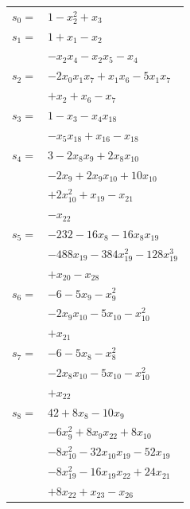 \begingroup
\small
\setlength{\tabcolsep}{2pt}
\setlength{\LTleft}{0pt}
\begin{longtable}{@{}r@{\;}l@{}}
\(s_{0}=\) & \(\displaystyle 1 -x_{2}^{2} +x_{3}\) \\[3pt]
\(s_{1}=\) & \(\displaystyle 1 +x_{1} -x_{2}\) \\
 & \(\displaystyle -x_{2}x_{4} -x_{2}x_{5} -x_{4}\) \\[3pt]
\(s_{2}=\) & \(\displaystyle -2x_{0}x_{1}x_{7} +x_{1}x_{6} -5x_{1}x_{7}\) \\
 & \(\displaystyle +x_{2} +x_{6} -x_{7}\) \\[3pt]
\(s_{3}=\) & \(\displaystyle 1 -x_{3} -x_{4}x_{18}\) \\
 & \(\displaystyle -x_{5}x_{18} +x_{16} -x_{18}\) \\[3pt]
\(s_{4}=\) & \(\displaystyle 3 -2x_{8}x_{9} +2x_{8}x_{10}\) \\
 & \(\displaystyle -2x_{9} +2x_{9}x_{10} +10x_{10}\) \\
 & \(\displaystyle +2x_{10}^{2} +x_{19} -x_{21}\) \\
 & \(\displaystyle -x_{22}\) \\[3pt]
\(s_{5}=\) & \(\displaystyle -232 -16x_{8} -16x_{8}x_{19}\) \\
 & \(\displaystyle -488x_{19} -384x_{19}^{2} -128x_{19}^{3}\) \\
 & \(\displaystyle +x_{20} -x_{28}\) \\[3pt]
\(s_{6}=\) & \(\displaystyle -6 -5x_{9} -x_{9}^{2}\) \\
 & \(\displaystyle -2x_{9}x_{10} -5x_{10} -x_{10}^{2}\) \\
 & \(\displaystyle +x_{21}\) \\[3pt]
\(s_{7}=\) & \(\displaystyle -6 -5x_{8} -x_{8}^{2}\) \\
 & \(\displaystyle -2x_{8}x_{10} -5x_{10} -x_{10}^{2}\) \\
 & \(\displaystyle +x_{22}\) \\[3pt]
\(s_{8}=\) & \(\displaystyle 42 +8x_{8} -10x_{9}\) \\
 & \(\displaystyle -6x_{9}^{2} +8x_{9}x_{22} +8x_{10}\) \\
 & \(\displaystyle -8x_{10}^{2} -32x_{10}x_{19} -52x_{19}\) \\
 & \(\displaystyle -8x_{19}^{2} -16x_{19}x_{22} +24x_{21}\) \\
 & \(\displaystyle +8x_{22} +x_{23} -x_{26}\) \\[3pt]

\end{longtable}
